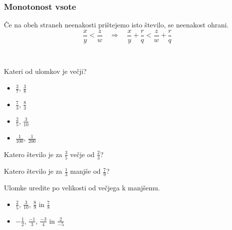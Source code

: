                 
                    \subsubsection*{Monotonost vsote}
                    Če na obeh straneh neenakosti prištejemo isto število, se neenakost ohrani.
                    $$ \dfrac{x}{y}<\dfrac{z}{w} \quad \Rightarrow \quad \dfrac{x}{y}+\dfrac{r}{q}<\dfrac{z}{w}+\dfrac{r}{q} $$


                    ~
                    \begin{naloga}
                        Kateri od ulomkov je večji?
                        \begin{itemize}
                            \item $\frac{3}{7}$, $\frac{3}{8}$ 
                            \item $\frac{7}{3}$, $\frac{8}{3}$ 
                            \item $\frac{2}{5}$, $\frac{3}{10}$ 
                            \item $\frac{1}{100}$, $\frac{1}{200}$ 
                        \end{itemize}
                    \end{naloga}
        
                    \begin{naloga}
                        Katero število je za $\frac{3}{5}$ večje od $\frac{2}{3}$?
                        
                    \end{naloga}
        
                    \begin{naloga}
                        Katero število je za $\frac{1}{3}$ manjše od $\frac{7}{9}$?
                        
                    \end{naloga}
        
                    \begin{naloga}
                        Ulomke uredite po velikosti od večjega k manjšemu.
                        \begin{itemize}
                            \item $\frac{2}{5}$, $\frac{3}{10}$, $\frac{8}{9}$ in $\frac{7}{8}$ 
                            \item $-\frac{1}{2}$, $\frac{-1}{3}$, $\frac{-3}{4}$ in $\frac{2}{-5}$ 
                        \end{itemize}
                    \end{naloga}
        
